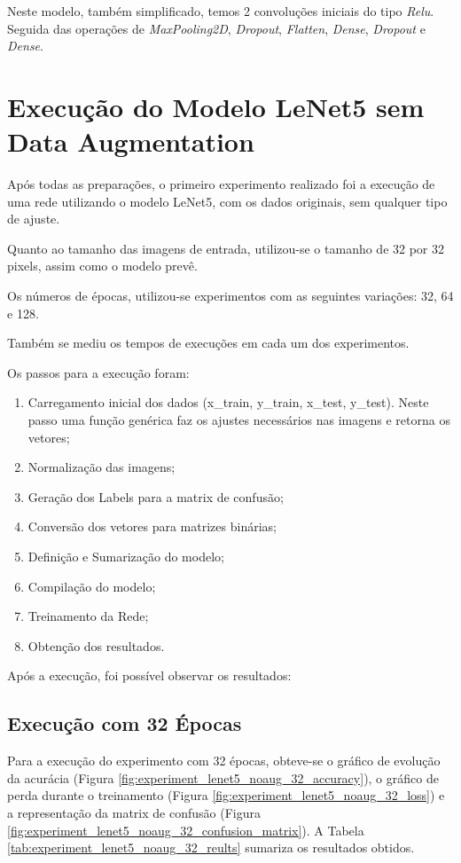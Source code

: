 \documentclass[12pt]{article}
\begin{document}
Neste modelo, também simplificado, temos 2 convoluções iniciais do tipo \textit{Relu}.
Seguida das operações de \textit{MaxPooling2D}, \textit{Dropout}, \textit{Flatten}, \textit{Dense}, \textit{Dropout} e \textit{Dense}.

\section{Execução do Modelo LeNet5 sem Data Augmentation}

Após todas as preparações, o primeiro experimento realizado foi a execução de uma rede utilizando o modelo LeNet5, com os dados originais, sem qualquer tipo de ajuste.

Quanto ao tamanho das imagens de entrada, utilizou-se o tamanho de 32 por 32 pixels, assim como o modelo prevê.

Os números de épocas, utilizou-se experimentos com as seguintes variações: 32, 64 e 128.

Também se mediu os tempos de execuções em cada um dos experimentos.

Os passos para a execução foram:

\begin{enumerate}
  \item Carregamento inicial dos dados (x\_train, y\_train, x\_test, y\_test). Neste passo uma função genérica faz os ajustes necessários nas imagens e retorna os vetores;
  \item Normalização das imagens;
  \item Geração dos Labels para a matrix de confusão;
  \item Conversão dos vetores para matrizes binárias;
  \item Definição e Sumarização do modelo;
  \item Compilação do modelo;
  \item Treinamento da Rede;
  \item Obtenção dos resultados.
\end{enumerate}

Após a execução, foi possível observar os resultados:

\subsection{Execução com 32 Épocas}

Para a execução do experimento com 32 épocas, obteve-se o gráfico de evolução da acurácia (Figura \ref{fig:experiment_lenet5_noaug_32_accuracy}), o gráfico de perda durante o treinamento (Figura \ref{fig:experiment_lenet5_noaug_32_loss}) e a representação da matrix de confusão (Figura \ref{fig:experiment_lenet5_noaug_32_confusion_matrix}). A Tabela \ref{tab:experiment_lenet5_noaug_32_reults} sumariza os resultados obtidos.
\end{document}
